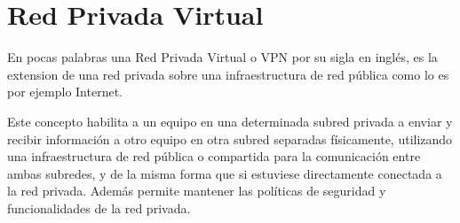 




\section{Red Privada Virtual}
\label{section2.7}

En pocas palabras una Red Privada Virtual o VPN por su sigla en ingl\'es, es la extension de una red privada sobre una infraestructura de red p\'ublica como lo es por ejemplo Internet.

Este concepto habilita a un equipo en una determinada subred privada a enviar y recibir información a otro equipo en otra subred separadas f\'isicamente, utilizando una infraestructura de red p\'ublica o compartida para la comunicaci\'on entre ambas subredes, y de la misma forma que si estuviese directamente conectada a la red privada. Adem\'as permite mantener las políticas de seguridad y funcionalidades de la red privada.\\

